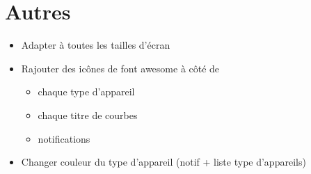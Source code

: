 \documentclass[10pt,a4paper]{article}
\begin{document}
\section{Autres}

\begin{itemize}[label=$\bullet$]
\setlength\itemsep{1em}
\item Adapter à toutes les tailles d'écran

\item Rajouter des icônes de font awesome à côté de 
    \begin{itemize}[label=$\circ$]
        \item chaque type d'appareil
        \item chaque titre de courbes
        \item notifications
    \end{itemize}

\item Changer couleur du type d'appareil (notif + liste type d'appareils)
\end{itemize}

\end{document}
